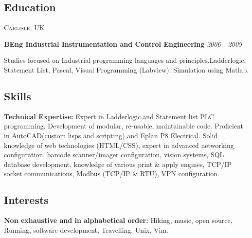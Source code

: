 \documentclass[letterpaper]{article}
\newcommand*\roottitle[1]{\subsection*{#1}}
\newcommand*\horizontalrule[2]{\vspace{#1}{\hrule}\vspace{#2}}
\newcommand*\headedSection[3]{\begin{indentpar}{15pt}\item[]\textscale{1.1}{#1}\hfill\textsc{#2}{#3}\end{indentpar}}
\newcommand*\headedSabSection[2]{\begin{indentpar}{15pt}\item[]\textbf{#1}\hfill\emph{#2}\end{indentpar}}
\newcommand*\body[1]{\begin{indentpar}{45pt}\item[]{#1}\end{indentpar}}
\newcommand*\inlineHeadedSection[2]{\begin{basedescript}{\setlength{\leftmargin}{30pt}}\item[\hspace{15pt}\textbf{#1}]{#2}\end{basedescript}}
\newenvironment{indentpar}[1]{
\begin{list}{}{\setlength{\leftmargin}{#1}\setlength{\parsep}{0pt}\setlength{\parskip}{0pt}\setlength{\itemsep}{0pt}\setlength{\topsep}{0pt}}}{\end{list}}
\begin{document}
\horizontalrule{1em}{-0.4em}
\roottitle{Education}
\headedSection{Carlisle College}{Carlisle, UK}
{\headedSabSection{BEng Industrial Instrumentation and Control Engineering }{2006 - 2009}}
\body{Studies focused on Industrial programming languages and
principles.Ladderlogic, Statement List, Pascal, Visual Programming (Labview).
Simulation using Matlab.}
\horizontalrule{1em}{-0.4em}
\roottitle{Skills}
\inlineHeadedSection{Technical Expertise:}
{Expert in Ladderlogic,and Statement list PLC programming. Development of
modular, re-usable, maintainable code. Proficient in AutoCAD(custom lisps and
scripting) and Eplan P8 Electrical. Solid knowledge of web technologies
(HTML/CSS), expert in advanced networking configuration, barcode scanner/imager configuration, vision systems, SQL database development, knowledge of various print \& apply engines, TCP/IP socket 
communications, Modbus (TCP/IP \& RTU), VPN configuration. }
\horizontalrule{0em}{-0.4em}
\roottitle{Interests}
\inlineHeadedSection{Non exhaustive and in alphabetical order:}
{Hiking, music, open source, Running, software development, Travelling, Unix, Vim.}
\end{document}
